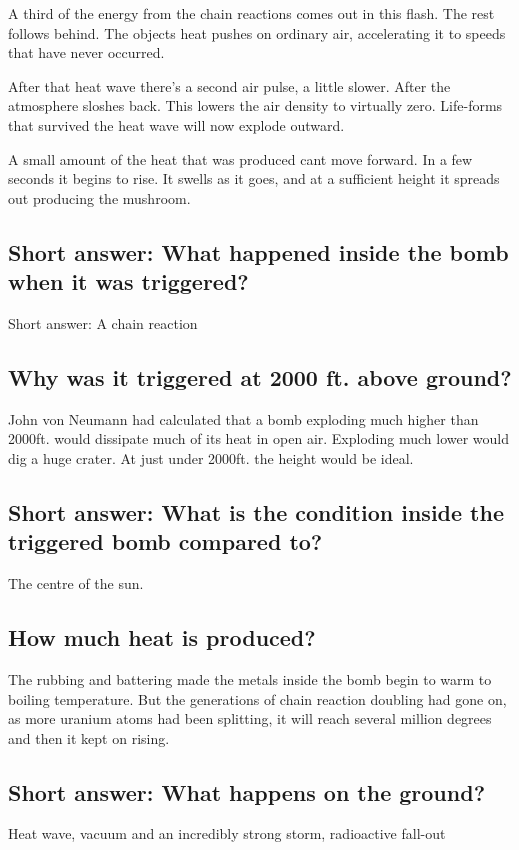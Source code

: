 A third of the energy from the chain reactions comes out in this flash. The rest follows behind. The objects heat pushes on ordinary air, accelerating it to speeds that have never occurred. 

After that heat wave there's a second air pulse, a little slower. After the atmosphere sloshes back. This lowers the air density to virtually zero. Life-forms that survived the heat wave will now explode outward.

A small amount of the heat that was produced cant move forward. In a few seconds it begins to rise. It swells as it goes, and at a sufficient height it spreads out producing the mushroom.

\subsection*{Short answer: What happened inside the bomb when it was triggered?}
Short answer: A chain reaction

\subsection*{Why was it triggered at 2000 ft. above ground?}
John von Neumann had calculated that a bomb exploding much higher than 2000ft. would dissipate much of its heat in open air. Exploding much lower would dig a huge crater. At just under 2000ft. the height would be ideal.

\subsection*{Short answer: What is the condition inside the triggered bomb compared to?}
The centre of the sun.

\subsection*{How much heat is produced?}
The rubbing and battering made the metals inside the bomb begin to warm to boiling temperature. But the generations of chain reaction doubling had gone on, as more uranium atoms had been splitting, it will reach several million degrees and then it kept on rising.


\subsection*{Short answer: What happens on the ground?}
Heat wave, vacuum and an incredibly strong storm, radioactive fall-out